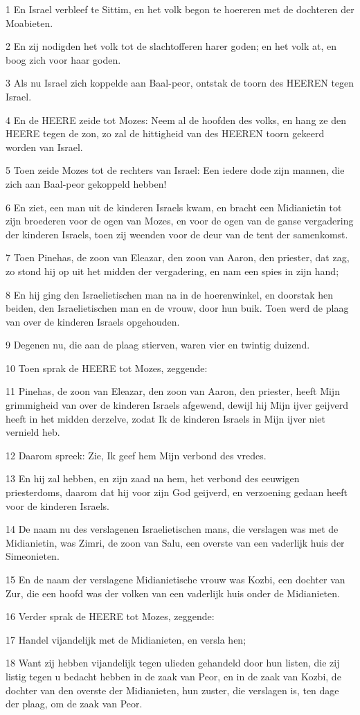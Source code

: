 \par 1 En Israel verbleef te Sittim, en het volk begon te hoereren met de dochteren der Moabieten.
\par 2 En zij nodigden het volk tot de slachtofferen harer goden; en het volk at, en boog zich voor haar goden.
\par 3 Als nu Israel zich koppelde aan Baal-peor, ontstak de toorn des HEEREN tegen Israel.
\par 4 En de HEERE zeide tot Mozes: Neem al de hoofden des volks, en hang ze den HEERE tegen de zon, zo zal de hittigheid van des HEEREN toorn gekeerd worden van Israel.
\par 5 Toen zeide Mozes tot de rechters van Israel: Een iedere dode zijn mannen, die zich aan Baal-peor gekoppeld hebben!
\par 6 En ziet, een man uit de kinderen Israels kwam, en bracht een Midianietin tot zijn broederen voor de ogen van Mozes, en voor de ogen van de ganse vergadering der kinderen Israels, toen zij weenden voor de deur van de tent der samenkomst.
\par 7 Toen Pinehas, de zoon van Eleazar, den zoon van Aaron, den priester, dat zag, zo stond hij op uit het midden der vergadering, en nam een spies in zijn hand;
\par 8 En hij ging den Israelietischen man na in de hoerenwinkel, en doorstak hen beiden, den Israelietischen man en de vrouw, door hun buik. Toen werd de plaag van over de kinderen Israels opgehouden.
\par 9 Degenen nu, die aan de plaag stierven, waren vier en twintig duizend.
\par 10 Toen sprak de HEERE tot Mozes, zeggende:
\par 11 Pinehas, de zoon van Eleazar, den zoon van Aaron, den priester, heeft Mijn grimmigheid van over de kinderen Israels afgewend, dewijl hij Mijn ijver geijverd heeft in het midden derzelve, zodat Ik de kinderen Israels in Mijn ijver niet vernield heb.
\par 12 Daarom spreek: Zie, Ik geef hem Mijn verbond des vredes.
\par 13 En hij zal hebben, en zijn zaad na hem, het verbond des eeuwigen priesterdoms, daarom dat hij voor zijn God geijverd, en verzoening gedaan heeft voor de kinderen Israels.
\par 14 De naam nu des verslagenen Israelietischen mans, die verslagen was met de Midianietin, was Zimri, de zoon van Salu, een overste van een vaderlijk huis der Simeonieten.
\par 15 En de naam der verslagene Midianietische vrouw was Kozbi, een dochter van Zur, die een hoofd was der volken van een vaderlijk huis onder de Midianieten.
\par 16 Verder sprak de HEERE tot Mozes, zeggende:
\par 17 Handel vijandelijk met de Midianieten, en versla hen;
\par 18 Want zij hebben vijandelijk tegen ulieden gehandeld door hun listen, die zij listig tegen u bedacht hebben in de zaak van Peor, en in de zaak van Kozbi, de dochter van den overste der Midianieten, hun zuster, die verslagen is, ten dage der plaag, om de zaak van Peor.

